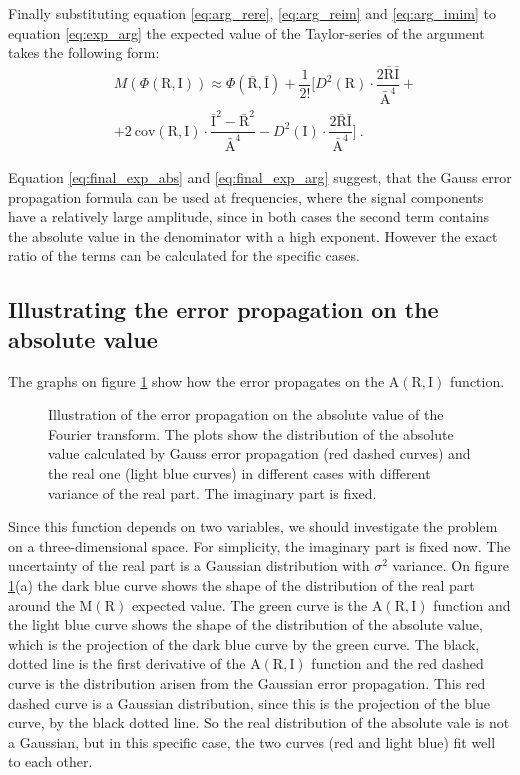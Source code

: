 \documentclass[a4paper,12pt,oneside]{article}
\newcommand{\Abs}{\mathrm{A}}
\newcommand{\Arg}{\Phi}
\newcommand{\R}{\mathrm{R}}
\newcommand{\I}{\mathrm{I}}
\begin{document}
Finally substituting equation \eqref{eq:arg_rere}, \eqref{eq:arg_reim} and \eqref{eq:arg_imim} to equation \eqref{eq:exp_arg} the expected value of the Taylor-series of the argument takes the following form:
\begin{eqnarray}\label{eq:final_exp_arg}
  & M \left( \Arg(\R, \I) \right) \approx \Arg(\bar{\R}, \bar{\I}) + \dfrac{1}{2!} \Bigg[ D^2(\R) \cdot \dfrac{2\bar{\R}\bar{\I}}{\bar{\Abs}^4} + \nonumber\\
  & + 2 \ \mathrm{cov}(\R, \I) \cdot \dfrac{\bar{\I}^2 - \bar{\R}^2}{\bar{\Abs}^4} - D^2(\I) \cdot \dfrac{2\bar{\R}\bar{\I}}{\bar{\Abs}^4} \Bigg] \ .
\end{eqnarray}

Equation \eqref{eq:final_exp_abs} and \eqref{eq:final_exp_arg} suggest, that the Gauss error propagation formula can be used at frequencies, where the signal components have a relatively large amplitude, since in both cases the second term contains the absolute value  in the denominator with a high exponent. However the exact ratio of the terms can be calculated for the specific cases.

\subsection{Illustrating the error propagation on the absolute value}

The graphs on figure \ref{fig:abs_illustration} show how the error propagates on the $\Abs(\R, \I)$ function.
\begin{figure}[htb!]
  \centerline{}
  \caption{\label{fig:abs_illustration}Illustration of the error propagation on the absolute value of the Fourier transform. The plots show the distribution of the absolute value calculated by Gauss error propagation (red dashed curves) and the real one (light blue curves) in different cases with different variance of the real part. The imaginary part is fixed.}
\end{figure}
Since this function depends on two variables, we should investigate the problem on a three-dimensional space. For simplicity, the imaginary part is fixed now. The uncertainty of the real part is a Gaussian distribution with $\sigma^2$ variance. On figure \ref{fig:abs_illustration}(a) the dark blue curve shows the shape of the distribution of the real part around the M$(\R)$ expected value. The green curve is the $\Abs(\R,\I)$ function and the light blue curve shows the shape of the distribution of the absolute value, which is the projection of the dark blue curve by the green curve. The black, dotted line is the first derivative of the $\Abs(\R, \I)$ function and the red dashed curve is the distribution arisen from the Gaussian error propagation. This red dashed curve is a Gaussian distribution, since this is the projection of the blue curve, by the black dotted line. So the real distribution of the absolute vale is not a Gaussian, but in this specific case, the two curves (red and light blue) fit well to each other.
\end{document}
